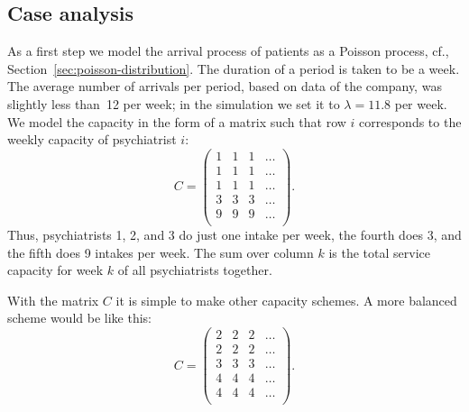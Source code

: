\subsection*{Case analysis}
\label{sec:case-analysis}

As a first step we model the arrival process of patients as a Poisson process, cf., Section~\ref{sec:poisson-distribution}.
The duration of a period is taken to be a week.
The average number of arrivals per period, based on data of the company, was slightly less than~12 per week; in the simulation we set it to $\lambda= 11.8$ per week.
We model the capacity in the form of a matrix such that row $i$ corresponds to the weekly capacity of psychiatrist $i$:
\begin{equation*}
C = 
  \begin{pmatrix}
    1 & 1 & 1 & \ldots\\
    1 & 1 & 1 & \ldots\\
    1 & 1 & 1 & \ldots\\
    3 & 3 & 3 & \ldots\\
    9 & 9 & 9 & \ldots\\
  \end{pmatrix}.
\end{equation*}
Thus, psychiatrists 1, 2, and 3 do just one intake per week, the
fourth does 3, and the fifth does 9 intakes per week. The sum over
column $k$ is the total service capacity for week $k$ of all
psychiatrists together.

With the matrix $C$ it is simple to make other capacity schemes. A
more balanced scheme would be like this:
\begin{equation*}
C = 
  \begin{pmatrix}
    2 & 2 & 2 & \ldots\\
    2 & 2 & 2 & \ldots\\
    3 & 3 & 3 & \ldots\\
    4 & 4 & 4 & \ldots\\
    4 & 4 & 4 & \ldots\\
  \end{pmatrix}.
\end{equation*}

